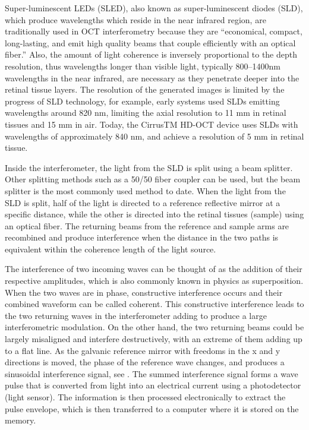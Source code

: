 Super-luminescent LEDs (SLED), also known as super-luminescent diodes (SLD),
which produce wavelengths which reside in the near infrared region, are
traditionally used in OCT interferometry because they are “economical,
compact, long-lasting, and emit high quality beams that couple efficiently
with an optical fiber.” \cite{mbib_6} Also, the amount of light coherence
is inversely proportional to the depth resolution, thus wavelengths longer
than visible light, typically 800–1400nm wavelengths in the near infrared,
are necessary as they penetrate deeper into the retinal tissue layers.\cite{mbib_4,mbib_7}
The resolution of the generated images is limited by the progress of SLD
technology, for example, early systems used SLDs emitting wavelengths around
820 nm, limiting the axial resolution to 11 mm in retinal tissues and 15 mm
in air. \cite{mbib_6}  Today, the CirrusTM HD-OCT device uses SLDs with wavelengths
of approximately 840 nm, and achieve a resolution of 5 mm in retinal tissue.\cite{mbib_7}

Inside the interferometer, the light from the SLD is split using a beam splitter.
Other splitting methods such as a 50/50 fiber coupler can be used, but the beam
splitter is the most commonly used method to date.  When the light from the SLD
is split, half of the light is directed to a reference reflective mirror at a
specific distance, while the other is directed into the retinal tissues (sample)
using an optical fiber.  The returning beams from the reference and sample arms
are recombined and produce interference when the distance in the two paths is
equivalent within the coherence length of the light source. \cite{mbib_5,mbib_6}

The interference of two incoming waves can be thought of as the addition of their
respective amplitudes, which is also commonly known in physics as superposition.
When the two waves are in phase, constructive interference occurs and their combined
waveform can be called coherent.  This constructive interference leads to the two
returning waves in the interferometer adding to produce a large interferometric
modulation.  On the other hand, the two returning beams could be largely misaligned
and interfere destructively, with an extreme of them adding up to a flat line.
As the galvanic reference mirror with freedoms in the x and y directions is moved,
the phase of the reference wave changes, and produces a sinusoidal interference
signal, see . The summed interference signal forms a wave pulse 
that is converted
from light into an electrical current using a photodetector (light sensor).\cite{mbib_6}
The information is then processed electronically to extract the pulse envelope, which
is then transferred to a computer where it is stored on the memory.\cite{mbib_6}

